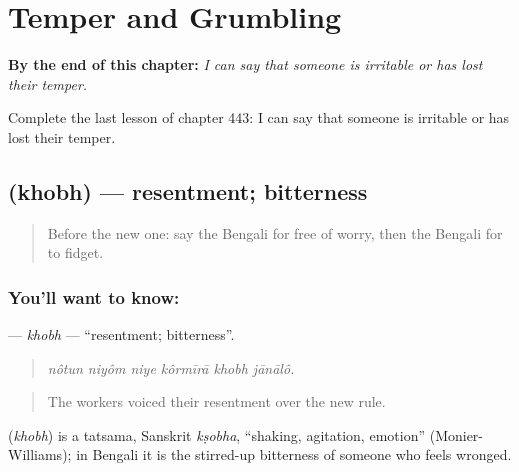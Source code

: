 
\chapter{Temper and Grumbling}
\label{ch:bn-temper-and-grumbling}

\begin{chapteropening}
\textbf{By the end of this chapter:} \emph{I can say that someone is irritable or has lost their temper.}

Complete the last lesson of chapter 443: I can say that someone is irritable or has lost their temper.
\end{chapteropening}

\section[\texorpdfstring{\bn{ক্ষোভ} (khobh)}{ক্ষোভ (khobh)}]{ (khobh) — resentment; bitterness}

\label{lesson:BN-C443-khobh}



\begin{quote}
Before the new one: say the Bengali for free of worry, then the Bengali for to fidget.
\end{quote}

\subsection*{You'll want to know: }
\textbf{} — \emph{khobh} — \textquotedblleft{}resentment; bitterness\textquotedblright{}.

\begin{quote}
     
\end{quote}

\begin{quote}
\emph{nôtun niyôm niye kôrmīrā khobh jānālô.}
\end{quote}

\begin{quote}
The workers voiced their resentment over the new rule.
\end{quote}

\begin{cousinweb}
\textbf{} (\emph{khobh}) is a tatsama, Sanskrit \emph{kṣobha}, \textquotedblleft{}shaking, agitation, emotion\textquotedblright{} (Monier-Williams); in Bengali it is the stirred-up bitterness of someone who feels wronged.
\end{cousinweb}

